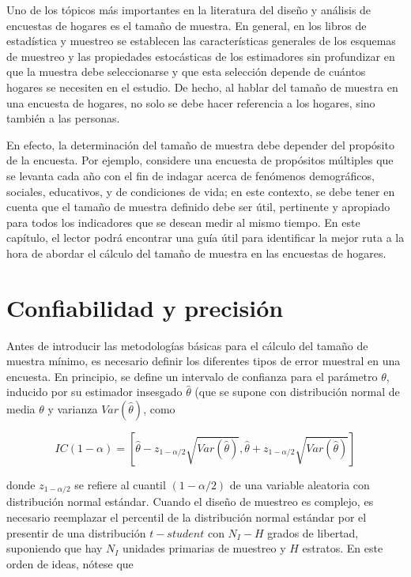 \documentclass[
  12pt,
]{book}
\begin{document}
Uno de los tópicos más importantes en la literatura del diseño y análisis de encuestas de hogares es el tamaño de muestra. En general, en los libros de estadística y muestreo se establecen las características generales de los esquemas de muestreo y las propiedades estocásticas de los estimadores sin profundizar en que la muestra debe seleccionarse y que esta selección depende de cuántos hogares se necesiten en el estudio. De hecho, al hablar del tamaño de muestra en una encuesta de hogares, no solo se debe hacer referencia a los hogares, sino también a las personas.

En efecto, la determinación del tamaño de muestra debe depender del propósito de la encuesta. Por ejemplo, considere una encuesta de propósitos múltiples que se levanta cada año con el fin de indagar acerca de fenómenos demográficos, sociales, educativos, y de condiciones de vida; en este contexto, se debe tener en cuenta que el tamaño de muestra definido debe ser útil, pertinente y apropiado para todos los indicadores que se desean medir al mismo tiempo. En este capítulo, el lector podrá encontrar una guía útil para identificar la mejor ruta a la hora de abordar el cálculo del tamaño de muestra en las encuestas de hogares.

\hypertarget{confiabilidad-y-precisiuxf3n}{%
\section{Confiabilidad y precisión}\label{confiabilidad-y-precisiuxf3n}}

Antes de introducir las metodologías básicas para el cálculo del tamaño de muestra mínimo, es necesario definir los diferentes tipos de error muestral en una encuesta. En principio, se define un intervalo de confianza para el parámetro \(\theta\), inducido por su estimador insesgado \(\hat{\theta}\) (que se supone con distribución normal de media \(\theta\) y varianza \(Var(\hat{\theta})\), como

\[
IC(1-\alpha)=\left[\hat{\theta}-z_{1-\alpha / 2}\sqrt{ Var(\hat{\theta})},\hat{\theta}+z_{1-\alpha / 2}\sqrt{Var(\hat{\theta})}\right]
\]

donde \(z_{1-\alpha / 2}\) se refiere al cuantil \((1-\alpha / 2)\) de una variable aleatoria con distribución normal estándar. Cuando el diseño de muestreo es complejo, es necesario reemplazar el percentil de la distribución normal estándar por el presentir de una distribución \(t-student\) con \(N_I - H\) grados de libertad, suponiendo que hay \(N_I\) unidades primarias de muestreo y \(H\) estratos. En este orden de ideas, nótese que
\end{document}
